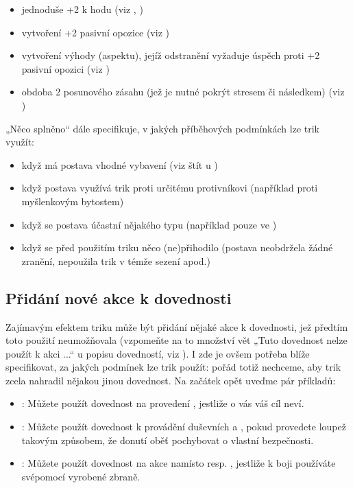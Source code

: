 \documentclass[../main.tex]{subfiles}
\begin{document}
\begin{itemize}
\item jednoduše +2 k hodu (viz , )
\item vytvoření +2 pasivní opozice (viz )
\item vytvoření výhody (aspektu), jejíž odstranění vyžaduje úspěch proti +2 pasivní opozici (viz )
\item obdoba 2 posunového zásahu (jež je nutné pokrýt stresem či následkem) (viz )
\end{itemize}

„Něco splněno“ dále specifikuje, v jakých příběhových podmínkách lze trik využít:

\begin{itemize}
\item když má postava vhodné vybavení (viz štít u )
\item když postava využívá trik proti určitému protivníkovi (například proti myšlenkovým bytostem)
\item když se postava účastní nějakého typu  (například pouze ve )
\item když se před použitím triku něco (ne)přihodilo (postava neobdržela žádné zranění, nepoužila trik v témže sezení apod.)
\end{itemize}

\subsection{Přidání nové akce k dovednosti}
\label{sec:trik-pridani}

Zajímavým efektem triku může být přidání nějaké akce k dovednosti, jež předtím toto použití neumožňovala (vzpomeňte na to množství vět „Tuto dovednost nelze použít k akci ...“ u popisu dovedností, viz ). I zde je ovšem potřeba blíže specifikovat, za jakých podmínek lze trik použít: pořád totiž nechceme, aby trik zcela nahradil nějakou jinou dovednost.  Na začátek opět uveďme pár příkladů:

\begin{itemize}
\item {}:
  Můžete použít dovednost  na provedení , jestliže o vás váš cíl neví.
\item {}:
  Můžete použít dovednost  k provádění duševních  a , pokud provedete loupež takovým způsobem, že donutí oběť pochybovat o vlastní bezpečnosti.
\item {}:
  Můžete použít dovednost  na akce  namísto  resp. , jestliže k boji používáte svépomocí vyrobené zbraně.
\end{itemize}
\end{document}
